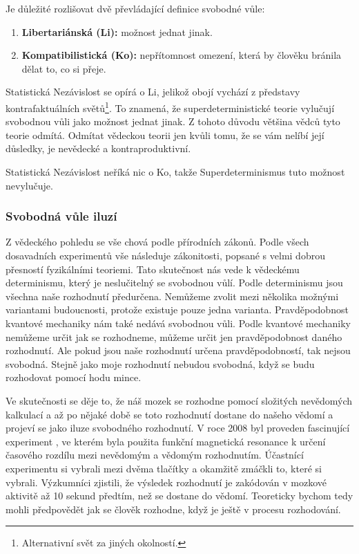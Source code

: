 Je důležité rozlišovat dvě převládající definice svobodné vůle:
\begin{enumerate}
    \item \textbf{Libertariánská (Li):} možnost jednat jinak.
    \item \textbf{Kompatibilistická (Ko):} nepřítomnost omezení, která by člověku bránila dělat to, co si přeje.
\end{enumerate}

Statistická Nezávislost se opírá o Li, jelikož obojí vychází z představy kontrafaktuálních světů\footnote[13]{Alternativní svět za jiných okolností.}. To znamená, že superdeterministické teorie vylučují svobodnou vůli jako možnost jednat jinak. Z tohoto důvodu většina vědců tyto teorie odmítá. Odmítat vědeckou teorii jen kvůli tomu, že se vám nelíbí její důsledky, je nevědecké a kontraproduktivní.

Statistická Nezávislost neříká nic o Ko, takže Superdeterminismus tuto možnost nevylučuje.

\subsubsection{Svobodná vůle iluzí}
Z vědeckého pohledu se vše chová podle přírodních zákonů. Podle všech dosavadních experimentů vše následuje zákonitosti, popsané s velmi dobrou přesností fyzikálními teoriemi. Tato skutečnost nás vede k vědeckému determinismu, který je neslučitelný se svobodnou vůlí. Podle determinismu jsou všechna naše rozhodnutí předurčena. Nemůžeme zvolit mezi několika možnými variantami budoucnosti, protože existuje pouze jedna varianta. Pravděpodobnost kvantové mechaniky nám také nedává svobodnou vůli. Podle kvantové mechaniky nemůžeme určit jak se rozhodneme, můžeme určit jen pravděpodobnost daného rozhodnutí. Ale pokud jsou naše rozhodnutí určena pravděpodobností, tak nejsou svobodná. Stejně jako moje rozhodnutí nebudou svobodná, když se budu rozhodovat pomocí hodu mince.

Ve skutečnosti se děje to, že náš mozek se rozhodne pomocí složitých nevědomých kalkulací a až po nějaké době se toto rozhodnutí dostane do našeho vědomí a projeví se jako iluze svobodného rozhodnutí. V roce 2008 byl proveden fascinující experiment \parencite{DecisionDet}, ve kterém byla použita funkční magnetická resonance k určení časového rozdílu mezi nevědomým a vědomým rozhodnutím. Účastnící experimentu si vybrali mezi dvěma tlačítky a okamžitě zmáčkli to, které si vybrali. Výzkumníci zjistili, že výsledek rozhodnutí je zakódován v mozkové aktivitě až 10 sekund předtím, než se dostane do vědomí. Teoreticky bychom tedy mohli předpovědět jak se člověk rozhodne, když je ještě v procesu rozhodování.

